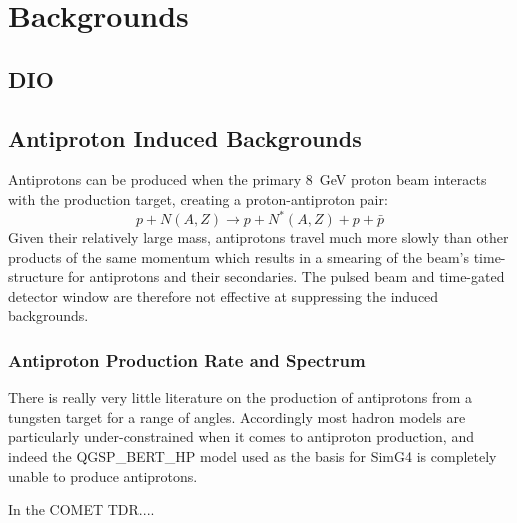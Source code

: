 
\chapter{\phaseII Backgrounds}
\section{\acf{DIO}}
\section{Antiproton Induced Backgrounds}
Antiprotons can be produced when the primary 8~GeV proton beam interacts with the production target, creating a proton-antiproton pair:
\begin{equation}
p + N(A,Z) \rightarrow p + N^*(A,Z) + p+\bar{p}
\end{equation}
Given their relatively large mass, antiprotons travel much more slowly than other products of the same momentum which results in a smearing of the beam's time-structure for antiprotons and their secondaries.
The pulsed beam and time-gated detector window are therefore not effective at suppressing the induced backgrounds.

\subsection{Antiproton Production Rate and Spectrum}
There is really very little literature on the production of antiprotons from a tungsten target for a range of angles.
Accordingly most hadron models are particularly under-constrained when it comes to antiproton production, and indeed the QGSP_BERT_HP model used as the basis for SimG4 is completely unable to produce antiprotons.

In the COMET TDR....

